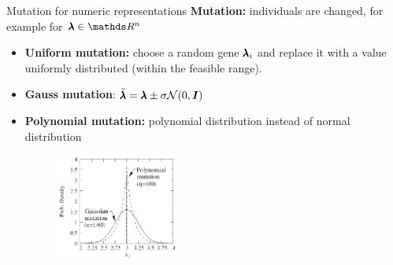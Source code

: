 \begin{frame}[containsverbatim]{Mutation for numeric representations }
  \textbf{Mutation:} individuals are changed, for example for $\xx \in \R^n$
  \begin{itemize}
  \item \textbf{Uniform mutation:} choose a random gene $\pmb{\lambda}_{i}$ and replace it with a value uniformly distributed (within the feasible range).
  \item \textbf{Gauss mutation}: $\tilde{\pmb{\lambda}} = \pmb{\lambda} \pm \sigma \mathcal{N}(0, \boldsymbol{I})$
  \item \textbf{Polynomial mutation:} polynomial distribution instead of normal distribution
  \begin{center}
  \begin{figure}
    \includegraphics[height = 3.5cm, width = 4cm]{images/polynomial_mutation.png}\\
  \end{figure}
   \end{center}
  \end{itemize}

  \end{frame}

